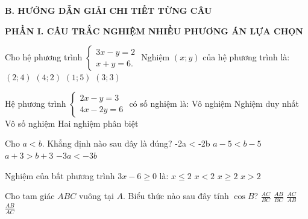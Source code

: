 \documentclass[12pt,a4paper]{article}
\begin{document}
\noindent\textbf{\large B. HƯỚNG DẪN GIẢI CHI TIẾT TỪNG CÂU}
\vspace{1mm}

\noindent\textbf{\large PHẦN I. CÂU TRẮC NGHIỆM NHIỀU PHƯƠNG ÁN LỰA CHỌN}
\vspace{1mm}
\begin{ex}
Cho hệ phương trình $\begin{cases} 3x - y = 2 \\ x + y = 6. \end{cases}$ Nghiệm $(x; y)$ của hệ phương trình là:
\choice
{\True $(2; 4)$}
{$(4; 2)$}
{$(1; 5)$}
{$(3; 3)$}
\end{ex}

\begin{ex}
Hệ phương trình $\begin{cases} 2x - y = 3 \\ 4x - 2y = 6 \end{cases}$ có số nghiệm là:
\choice
{Vô nghiệm}
{Nghiệm duy nhất}
{\True Vô số nghiệm}
{Hai nghiệm phân biệt}
\end{ex}

\begin{ex}
Cho $a < b$. Khẳng định nào sau đây là đúng?
\choice
{-2a < -2b}
{\True $a - 5 < b - 5$}
{$a + 3 > b + 3$}
{$-3a < -3b$}
\end{ex}

\begin{ex}
Nghiệm của bất phương trình $3x - 6 \ge 0$ là:
\choice
{$x \le 2$}
{$x < 2$}
{\True $x \ge 2$}
{$x > 2$}
\end{ex}

\begin{ex}
Cho tam giác $ABC$ vuông tại $A$. Biểu thức nào sau đây tính $\cos B$?
\choice
{$\frac{AC}{BC}$}
{\True $\frac{AB}{BC}$}
{$\frac{AC}{AB}$}
{$\frac{AB}{AC}$}
\end{ex}
\end{document}

